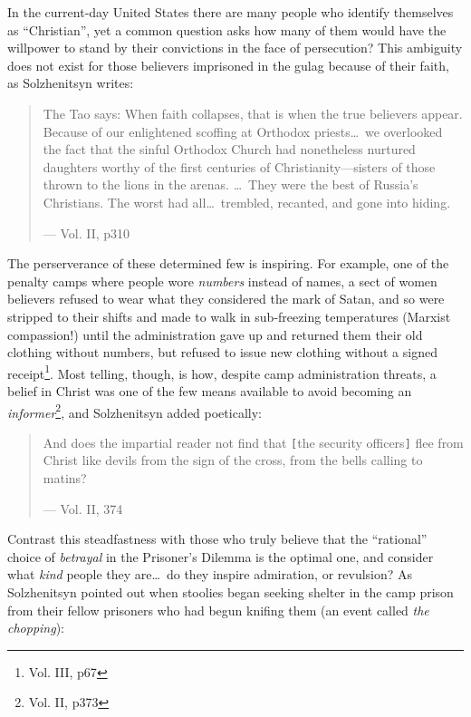 \documentclass{article}
\begin{document}
In the current-day United States there are many people who identify themselves as ``Christian'', yet a common question asks how many of them would have the willpower to stand by their convictions in the face of persecution?  This ambiguity does not exist for those believers imprisoned in the gulag because of their faith, as Solzhenitsyn writes:

\begin{quote}
The Tao says: When faith collapses, that is when the true believers appear.  Because of our enlightened scoffing at Orthodox priests\ldots~we overlooked the fact that the sinful Orthodox Church had nonetheless nurtured daughters worthy of the first centuries of Christianity---sisters of those thrown to the lions in the arenas.  \ldots~They were the best of Russia's Christians.  The worst had all\ldots~trembled, recanted, and gone into hiding.

--- Vol. II, p310
\end{quote}

The perserverance of these determined few is inspiring.  For example, one of the penalty camps where people wore \emph{numbers} instead of names, a sect of women believers refused to wear what they considered the mark of Satan, and so were stripped to their shifts and made to walk in sub-freezing temperatures (Marxist compassion!) until the administration gave up and returned them their old clothing without numbers, but refused to issue new clothing without a signed receipt\footnote{Vol. III, p67}.  Most telling, though, is how, despite camp administration threats, a belief in Christ was one of the few means available to avoid becoming an \emph{informer}\footnote{Vol. II, p373}, and Solzhenitsyn added poetically:

\begin{quote}
And does the impartial reader not find that \verb|[|the security officers\verb|]| flee from Christ like devils from the sign of the cross, from the bells calling to matins?

--- Vol. II, 374
\end{quote}

Contrast this steadfastness with those who truly believe that the ``rational'' choice of \emph{betrayal} in the Prisoner's Dilemma is the optimal one, and consider what \emph{kind} people they are\ldots~do they inspire admiration, or revulsion?  As Solzhenitsyn pointed out when stoolies began seeking shelter in the camp prison from their fellow prisoners who had begun knifing them (an event called \emph{the chopping}):
\end{document}
